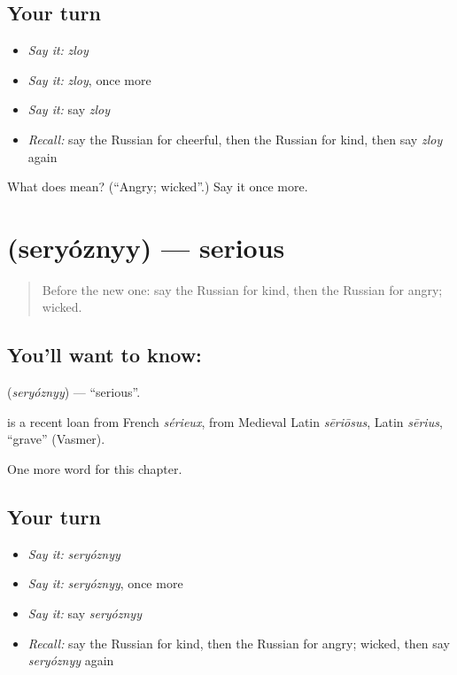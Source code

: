 \subsection*{Your turn}
\begin{itemize}
\raggedright
  \item \emph{Say it:} \emph{zloy}
  \item \emph{Say it:} \emph{zloy}, once more
  \item \emph{Say it:} say \emph{zloy}
  \item \emph{Recall:} say the Russian for cheerful, then the Russian for kind, then say \emph{zloy} again
\end{itemize}

\begin{tcolorbox}[breakable,colback=teal!4,colframe=teal!35!black,title={Before you move on}]
What does  mean? (\textquotedblleft{}Angry; wicked\textquotedblright{}.) Say it once more.
\end{tcolorbox}
\section[\texorpdfstring{\ru{серьёзный} (seryóznyy)}{серьёзный (seryóznyy)}]{ (seryóznyy) — serious}

\label{lesson:RU-C127-serious}



\begin{quote}
Before the new one: say the Russian for kind, then the Russian for angry; wicked.
\end{quote}

\subsection*{You'll want to know: }
\textbf{} (\emph{seryóznyy}) — \textquotedblleft{}serious\textquotedblright{}.

\begin{cousinweb}
\textbf{} is a recent loan from French \emph{sérieux}, from Medieval Latin \emph{sēriōsus}, Latin \emph{sērius}, \textquotedblleft{}grave\textquotedblright{} (Vasmer).
\end{cousinweb}

\begin{grammarlens}[title={What you've built}]
One more word for this chapter.
\end{grammarlens}

\subsection*{Your turn}
\begin{itemize}
\raggedright
  \item \emph{Say it:} \emph{seryóznyy}
  \item \emph{Say it:} \emph{seryóznyy}, once more
  \item \emph{Say it:} say \emph{seryóznyy}
  \item \emph{Recall:} say the Russian for kind, then the Russian for angry; wicked, then say \emph{seryóznyy} again
\end{itemize}

